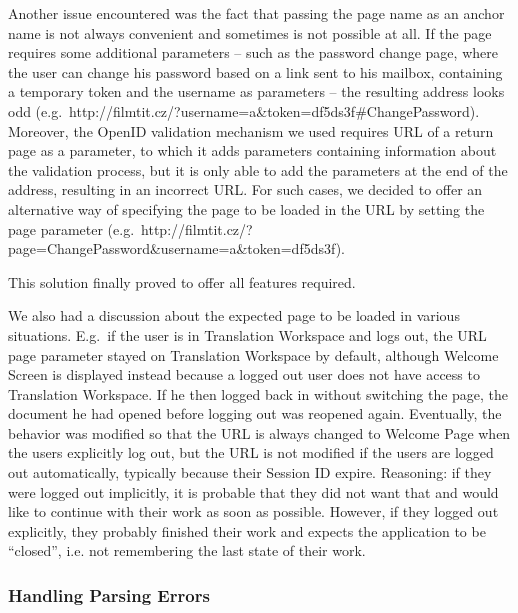 Another issue encountered was the fact that passing the page name as an anchor name is not always convenient and sometimes is not possible at all. If the page requires some additional parameters -- such as the password change page, where the user can change his password based on a link sent to his mailbox, containing a temporary token and the username as parameters -- the resulting address looks odd (e.g.\ http://filmtit.cz/?username=a\&token=df5ds3f\#ChangePassword). Moreover, the OpenID validation mechanism we used requires URL of a return page as a parameter, to which it adds parameters containing information about the validation process, but it is only able to add the parameters at the end of the address, resulting in an incorrect URL. For such cases, we decided to offer an alternative way of specifying the page to be loaded in the URL by setting the page parameter (e.g.\ http://filmtit.cz/?page=ChangePassword\&username=a\&token=df5ds3f).

This solution finally proved to offer all features required.

We also had a discussion about the expected page to be loaded in various situations. E.g.\ if the user is in Translation Workspace and logs out, the URL page parameter stayed on Translation Workspace by default, although Welcome Screen is displayed instead because a logged out user does not have access to Translation Workspace. If he then logged back in without switching the page, the document he had opened before logging out was reopened again.
Eventually, the behavior was modified so that the URL is always changed to Welcome Page when the users explicitly log out, but the URL is not modified if the users are logged out automatically, typically because their Session ID expire. Reasoning: if they were logged out implicitly, it is probable that they did not want that and would like to continue with their work as soon as possible. However, if they logged out explicitly, they probably finished their work and expects the application to be ``closed'', i.e. not remembering the last state of their work.


\subsubsection{Handling Parsing Errors}


